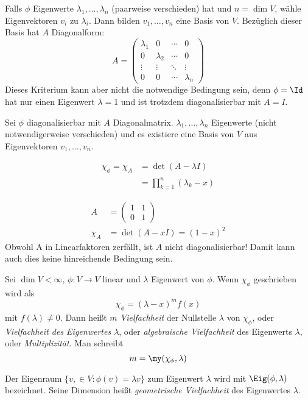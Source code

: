 \documentclass{mycourse}
\begin{document}
Falls $\phi$ Eigenwerte $\lambda_1,\dotsc, \lambda_n$ (paarweise verschieden) hat und $n=\dim V$,
wähle Eigenvektoren $v_i$ zu $\lambda_i$.
Dann bilden $v_1,\dotsc, v_n$ eine Basis von $V$.
Bezüglich dieser Basis hat $A$ Diagonalform:
\[
A=\begin{pmatrix}\lambda_1&0&\cdots&0\\ 0&\lambda_2&\cdots&0\\ \vdots & \vdots & \ddots & \vdots \\0&0&\cdots& \lambda_n\end{pmatrix}
\]
Dieses Kriterium kann aber nicht die notwendige Bedingung sein, denn $\phi=\Id$ hat nur einen Eigenwert $\lambda=1$ und ist trotzdem diagonalisierbar mit $A=I$.

Sei $\phi$ diagonalisierbar mit $A$ Diagonalmatrix.
$\lambda_1,\dotsc,\lambda_n$ Eigenwerte (nicht notwendigerweise verschieden) und es existiere eine Basis von $V$ aus Eigenvektoren $v_1,\dotsc,v_n$.

\begin{align*}
\chi_\phi=\chi_A&=\det(A-\lambda I)\\
&=\prod_{k=1}^n(\lambda_k-x)
\end{align*}

\begin{ex}
\begin{align*}
A&= \begin{pmatrix}1&1\\0&1\end{pmatrix}\\
\chi_A&=\det(A-xI)=(1-x)^2
\end{align*}
Obwohl A in Linearfaktoren zerfällt, ist $A$ nicht diagonalisierbar! Damit kann auch dies keine hinreichende Bedingung sein.
\end{ex}


\begin{df}
\label{df:11.1}
Sei $\dim V<\infty$, $\phi:V\to V$ linear und $\lambda$ Eigenwert von $\phi$.
Wenn $\chi_\phi$ geschrieben wird als
\[
\chi_\phi=(\lambda - x)^m f(x)
\]
mit $f(\lambda)\neq 0$.
Dann heißt $m$ \emph{Vielfachheit} der Nullstelle $\lambda$ von $\chi_\phi$, oder \emph{Vielfachheit des Eigenwertes $\lambda$}, oder \emph{algebraische Vielfachheit} des Eigenwerts $\lambda$, oder \emph{Multiplizität}.
Man schreibt
\[
m=\my(\chi_\phi,\lambda)
\]

Der Eigenraum $\{v,\in V:\phi(v)=\lambda v\}$ zum Eigenwert $\lambda$ wird mit
$\Eig(\phi,\lambda)$ bezeichnet.
Seine Dimension heißt \emph{geometrische Vielfachheit} des Eigenwertes $\lambda$.
\end{df}
\end{document}
